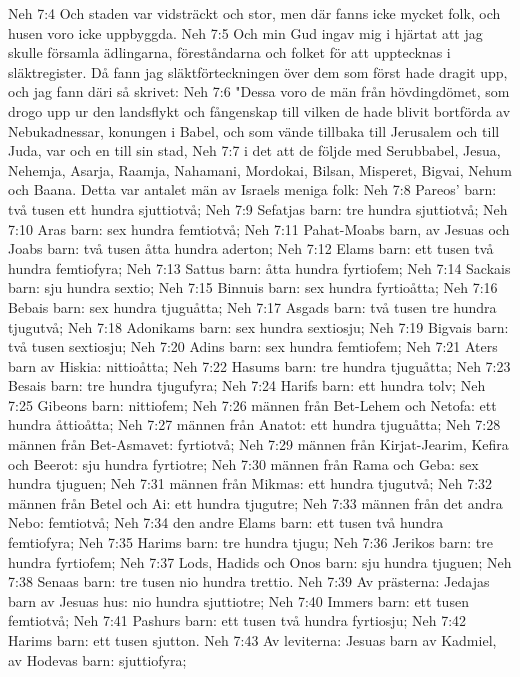 Neh 7:4  Och staden var vidsträckt och stor, men där fanns icke mycket folk, och husen voro icke uppbyggda.
Neh 7:5  Och min Gud ingav mig i hjärtat att jag skulle församla ädlingarna, föreståndarna och folket för att upptecknas i släktregister. Då fann jag släktförteckningen över dem som först hade dragit upp, och jag fann däri så skrivet:
Neh 7:6  "Dessa voro de män från hövdingdömet, som drogo upp ur den landsflykt och fångenskap till vilken de hade blivit bortförda av Nebukadnessar, konungen i Babel, och som vände tillbaka till Jerusalem och till Juda, var och en till sin stad,
Neh 7:7  i det att de följde med Serubbabel, Jesua, Nehemja, Asarja, Raamja, Nahamani, Mordokai, Bilsan, Misperet, Bigvai, Nehum och Baana. Detta var antalet män av Israels meniga folk:
Neh 7:8  Pareos' barn: två tusen ett hundra sjuttiotvå;
Neh 7:9  Sefatjas barn: tre hundra sjuttiotvå;
Neh 7:10  Aras barn: sex hundra femtiotvå;
Neh 7:11  Pahat-Moabs barn, av Jesuas och Joabs barn: två tusen åtta hundra aderton;
Neh 7:12  Elams barn: ett tusen två hundra femtiofyra;
Neh 7:13  Sattus barn: åtta hundra fyrtiofem;
Neh 7:14  Sackais barn: sju hundra sextio;
Neh 7:15  Binnuis barn: sex hundra fyrtioåtta;
Neh 7:16  Bebais barn: sex hundra tjuguåtta;
Neh 7:17  Asgads barn: två tusen tre hundra tjugutvå;
Neh 7:18  Adonikams barn: sex hundra sextiosju;
Neh 7:19  Bigvais barn: två tusen sextiosju;
Neh 7:20  Adins barn: sex hundra femtiofem;
Neh 7:21  Aters barn av Hiskia: nittioåtta;
Neh 7:22  Hasums barn: tre hundra tjuguåtta;
Neh 7:23  Besais barn: tre hundra tjugufyra;
Neh 7:24  Harifs barn: ett hundra tolv;
Neh 7:25  Gibeons barn: nittiofem;
Neh 7:26  männen från Bet-Lehem och Netofa: ett hundra åttioåtta;
Neh 7:27  männen från Anatot: ett hundra tjuguåtta;
Neh 7:28  männen från Bet-Asmavet: fyrtiotvå;
Neh 7:29  männen från Kirjat-Jearim, Kefira och Beerot: sju hundra fyrtiotre;
Neh 7:30  männen från Rama och Geba: sex hundra tjuguen;
Neh 7:31  männen från Mikmas: ett hundra tjugutvå;
Neh 7:32  männen från Betel och Ai: ett hundra tjugutre;
Neh 7:33  männen från det andra Nebo: femtiotvå;
Neh 7:34  den andre Elams barn: ett tusen två hundra femtiofyra;
Neh 7:35  Harims barn: tre hundra tjugu;
Neh 7:36  Jerikos barn: tre hundra fyrtiofem;
Neh 7:37  Lods, Hadids och Onos barn: sju hundra tjuguen;
Neh 7:38  Senaas barn: tre tusen nio hundra trettio.
Neh 7:39  Av prästerna: Jedajas barn av Jesuas hus: nio hundra sjuttiotre;
Neh 7:40  Immers barn: ett tusen femtiotvå;
Neh 7:41  Pashurs barn: ett tusen två hundra fyrtiosju;
Neh 7:42  Harims barn: ett tusen sjutton.
Neh 7:43  Av leviterna: Jesuas barn av Kadmiel, av Hodevas barn: sjuttiofyra;
